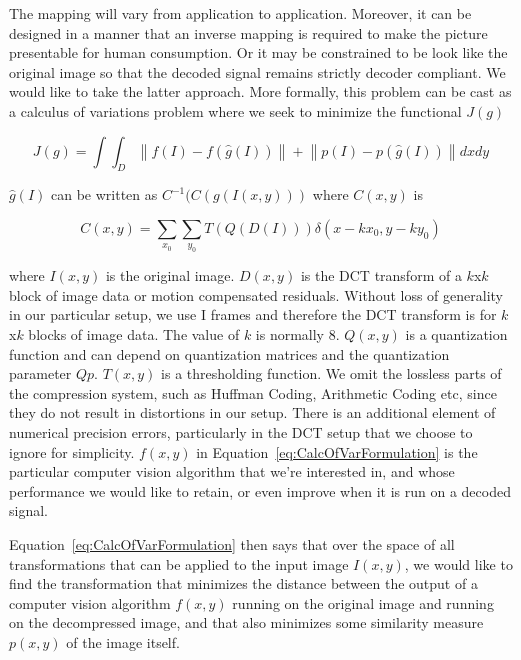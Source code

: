 \documentclass{article}
\begin{document}
The mapping will vary from application to application.  Moreover, it can be designed in a manner that an inverse mapping is required to make the picture presentable for human consumption.  Or it may be constrained to be look like the original image so that the decoded signal remains strictly decoder compliant.  We would like to take the latter approach.  More formally, this problem can be cast as a calculus of variations problem where we seek to minimize the functional $J(g)$

\begin{equation}
\label{eq:CalcOfVarFormulation}
J(g)=\int\int_D \left\|f(I) - f(\hat{g}(I)) \right\|  +  \left\|p(I) - p(\hat{g}(I)) \right\| dxdy
\end{equation}

$\hat{g}(I)$ can be written as $C^{-1}(C(g(I(x,y)))$ where $C(x,y)$ is

\begin{equation}
\label{eq:DCT}
C(x,y) = \sum_{x_0}\sum_{y_0}T(Q(D(I)))\delta(x-kx_0, y-ky_0)
\end{equation}

where $I(x,y)$ is the original image.  $D(x,y)$ is the DCT transform of a $k$x$k$ block of image data or motion compensated residuals.  Without loss of generality in our particular setup, we use I frames and therefore the DCT transform is for $k$x$k$ blocks of image data.  The value of $k$ is normally 8.  $Q(x,y)$ is a quantization function and can depend on quantization matrices and the quantization parameter $Qp$. $T(x,y)$  is a thresholding function.  We omit the lossless parts of the compression system, such as Huffman Coding, Arithmetic Coding etc, since they do not result in distortions in our setup.  There is an additional element of numerical precision errors, particularly in the DCT setup that we choose to ignore for simplicity.  $f(x,y)$ in Equation~\ref{eq:CalcOfVarFormulation} is the particular computer vision algorithm that we're interested in, and whose performance we would like to retain, or even improve when it is run on a decoded signal.

Equation~\ref{eq:CalcOfVarFormulation} then says that over the space of all transformations that can be applied to the input image $I(x,y)$, we would like to find the transformation that minimizes the distance between the output of a computer vision algorithm $f(x,y)$ running on the original image and running on the decompressed image, and that also minimizes some similarity measure $p(x,y)$ of the image itself.  
\end{document}
